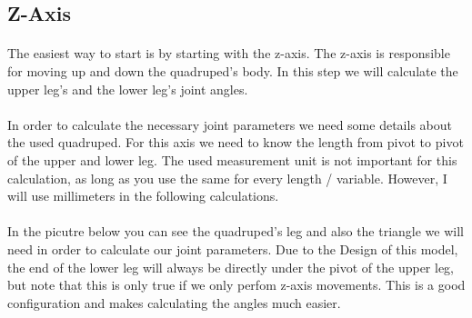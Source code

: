 \documentclass{article}
\begin{document}
    
    \pagebreak
    \subsection{Z-Axis}
    \paragraph{} %
    The easiest way to start is by starting with the z-axis. The z-axis is responsible for moving up and down the quadruped's body. In this step we will calculate the upper leg's and the lower leg's joint angles.

    \paragraph{}
    In order to calculate the necessary joint parameters we need some details about the used quadruped. For this axis we need to know the length from pivot to pivot of the upper and lower leg. The used measurement unit is not important for this calculation, as long as you use the same for every length / variable. However, I will use millimeters in the following calculations.

    \paragraph{}
    In the picutre below you can see the quadruped's leg and also the triangle we will need in order to calculate our joint parameters. Due to the Design of this model, the end of the lower leg will always be directly under the pivot of the upper leg, but note that this is only true if we only perfom z-axis movements. This is a good configuration and makes calculating the angles much easier.
    
\end{document}
